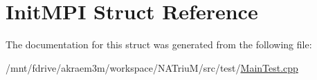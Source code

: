\hypertarget{structInitMPI}{
\section{InitMPI Struct Reference}
\label{structInitMPI}
}


The documentation for this struct was generated from the following file:\begin{DoxyCompactItemize}
\item 
/mnt/fdrive/akraem3m/workspace/NATriuM/src/test/\hyperlink{MainTest_8cpp}{MainTest.cpp}\end{DoxyCompactItemize}
